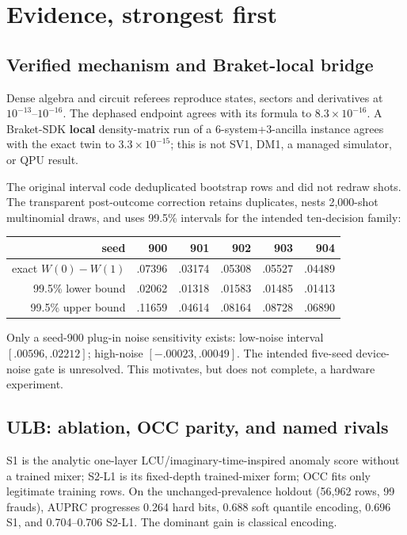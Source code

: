 \documentclass[10pt,a4paper]{article}
\begin{document}
\section{Evidence, strongest first}

\subsection{Verified mechanism and Braket-local bridge}

Dense algebra and circuit referees reproduce states, sectors and derivatives
at $10^{-13}$--$10^{-16}$. The dephased endpoint agrees with its formula to
$8.3\times10^{-16}$. A Braket-SDK \textbf{local} density-matrix run of a
6-system+3-ancilla instance agrees with the exact twin to
$3.3\times10^{-15}$; this is not SV1, DM1, a managed simulator, or QPU result.

The original interval code deduplicated bootstrap rows and did not redraw
shots. The transparent post-outcome correction retains duplicates, nests
2,000-shot multinomial draws, and uses 99.5\% intervals for the intended
ten-decision family:
\begin{center}\small
\begin{tabular}{@{}rrrrrr@{}}
\toprule
seed & 900 & 901 & 902 & 903 & 904\\
\midrule
exact $W(0)-W(1)$ & .07396 & .03174 & .05308 & .05527 & .04489\\
99.5\% lower bound & .02062 & .01318 & .01583 & .01485 & .01413\\
99.5\% upper bound & .11659 & .04614 & .08164 & .08728 & .06890\\
\bottomrule
\end{tabular}
\end{center}
Only a seed-900 plug-in noise sensitivity exists: low-noise interval
$[.00596,.02212]$; high-noise $[-.00023,.00049]$. The intended five-seed
device-noise gate is unresolved. This motivates, but does not complete, a
hardware experiment.

\subsection{ULB: ablation, OCC parity, and named rivals}

S1 is the analytic one-layer LCU/imaginary-time-inspired anomaly score without
a trained mixer; S2-L1 is its fixed-depth trained-mixer form; OCC fits only
legitimate training rows. On the unchanged-prevalence holdout (56,962 rows,
99 frauds), AUPRC progresses 0.264 hard bits, 0.688 soft quantile encoding,
0.696 S1, and 0.704--0.706 S2-L1. The dominant gain is classical encoding.
\end{document}
